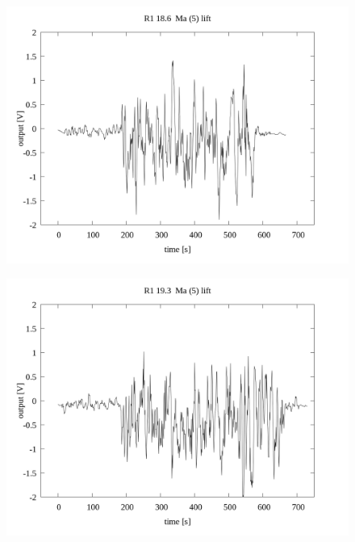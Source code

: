 \documentclass[a4paper]{jsarticle}
\begin{document}
\begin{figure}[htbp]
    \footnotesize
    \begin{center}
        \includegraphics[width=140mm]{../../../../33_result/210806/moving_average/5/lift/01/R1_18.6_ma(5)_lift_01.png}
    \end{center}
\end{figure}

\begin{figure}[htbp]
    \footnotesize
    \begin{center}
        \includegraphics[width=140mm]{../../../../33_result/210806/moving_average/5/lift/01/R1_19.3_ma(5)_lift_01.png}
    \end{center}
\end{figure}
\end{document}

